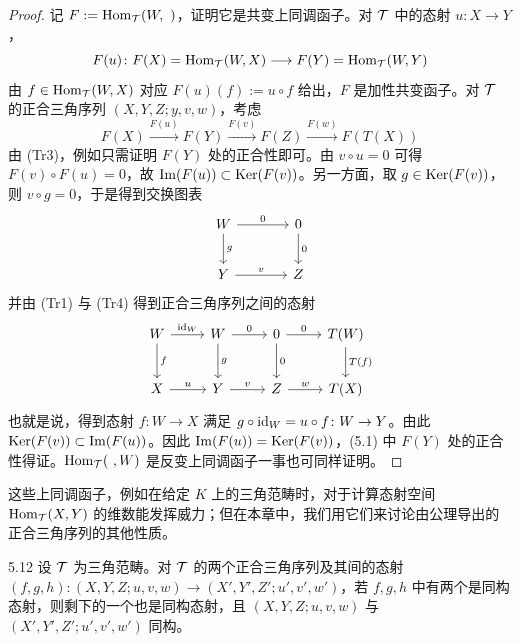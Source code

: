\begin{proof}
记 $F := \Hom_{\cT}(W,\ )$，证明它是共变上同调函子。对 $\mathcal{T}$ 中的态射 $u\colon X\to Y$，
\[
F(u)\colon F(X)=\operatorname{Hom}_{\mathcal{T}}(W,X)\longrightarrow F(Y)=\operatorname{Hom}_{\mathcal{T}}(W,Y)
\]
由 $f\in\operatorname{Hom}_{\mathcal{T}}(W,X)$ 对应 $F(u)(f) := u\circ f$ 给出，$F$ 是加性共变函子。对 $\mathcal{T}$ 的正合三角序列 $(X,Y,Z;y,v,w)$，考虑
\begin{equation}
F(X)\xrightarrow{F(u)} F(Y)\xrightarrow{F(v)} F(Z)\xrightarrow{F(w)} F(T(X)) \tag{5.1}
\end{equation}
由 (Tr3)，例如只需证明 $F(Y)$ 处的正合性即可。由 $v\circ u=0$ 可得 $F(v)\circ F(u)=0$，故 $\operatorname{Im}(F(u))\subset\operatorname{Ker}(F(v))$。另一方面，取 $g\in\operatorname{Ker}(F(v))$，则 $v\circ g=0$，于是得到交换图表
\[
\begin{tikzcd}[row sep=2.2em, column sep=3.6em]
W \arrow[r,"0"] \arrow[d,"g"] & 0 \arrow[d,"0"] \\
Y \arrow[r,"v"] & Z
\end{tikzcd}
\]
并由 (Tr1) 与 (Tr4) 得到正合三角序列之间的态射
\[
\begin{tikzcd}[row sep=2.2em, column sep=2.4em]
W \arrow[r,"\id_W"] \arrow[d,"f"] & W \arrow[r,"0"] \arrow[d,"g"] & 0 \arrow[r,"0"] \arrow[d,"0"] & T(W) \arrow[d,"T(f)"] \\
X \arrow[r,"u"] & Y \arrow[r,"v"] & Z \arrow[r,"w"] & T(X)
\end{tikzcd}
\]
也就是说，得到态射 $f\colon W\to X$ 满足 $g\circ\mathrm{id}_W = u\circ f\colon W\to Y$。由此 $\operatorname{Ker}(F(v))\subset\operatorname{Im}(F(u))$。因此 $\operatorname{Im}(F(u))=\operatorname{Ker}(F(v))$，(5.1) 中 $F(Y)$ 处的正合性得证。$\operatorname{Hom}_{\mathcal{T}}(\ ,W)$ 是反变上同调函子一事也可同样证明。
\end{proof}


这些上同调函子，例如在给定 $K$ 上的三角范畴时，对于计算态射空间 $\operatorname{Hom}_{\mathcal{T}}(X,Y)$ 的维数能发挥威力；但在本章中，我们用它们来讨论由公理导出的正合三角序列的其他性质。

\begin{lemma}{5.12}
设 $\mathcal{T}$ 为三角范畴。对 $\mathcal{T}$ 的两个正合三角序列及其间的态射 $(f,g,h)\colon(X,Y,Z;u,v,w)\to(X',Y',Z';u',v',w')$，若 $f,g,h$ 中有两个是同构态射，则剩下的一个也是同构态射，且 $(X,Y,Z;u,v,w)$ 与 $(X',Y',Z';u',v',w')$ 同构。
\end{lemma}

